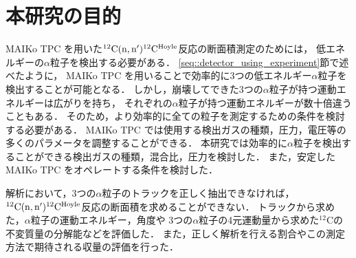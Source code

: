 \documentclass[../master]{subfiles}
\begin{document}

\section{本研究の目的}
MAIKo TPC を用いた${}^{12}{\rm C}({\rm n},{\rm n}'){}^{12}{\rm C}^{\rm Hoyle}$反応の断面積測定のためには，
低エネルギーの$\alpha$粒子を検出する必要がある．
\ref{seq::detector_using_experiment}節で述べたように，
MAIKo TPC を用いることで効率的に3つの低エネルギー$\alpha$粒子を検出することが可能となる．
しかし，崩壊してできた3つの$\alpha$粒子が持つ運動エネルギーは広がりを持ち，
それぞれの$\alpha$粒子が持つ運動エネルギーが数十倍違うこともある．
そのため，より効率的に全ての粒子を測定するための条件を検討する必要がある．
MAIKo TPC では使用する検出ガスの種類，圧力，電圧等の多くのパラメータを調整することができる．
本研究では効率的に$\alpha$粒子を検出することができる検出ガスの種類，混合比，圧力を検討した．
また，安定したMAIKo TPC をオペレートする条件を検討した．

解析において，3つの$\alpha$粒子のトラックを正しく抽出できなければ，
${}^{12}{\rm C}({\rm n},{\rm n}'){}^{12}{\rm C}^{\rm Hoyle}$反応の断面積を求めることができない．
トラックから求めた，$\alpha$粒子の運動エネルギー，角度や
3つの$\alpha$粒子の4元運動量から求めた${}^{12}\mathrm{C}$の不変質量の分解能などを評価した．
また，正しく解析を行える割合やこの測定方法で期待される収量の評価を行った．
\end{document}
